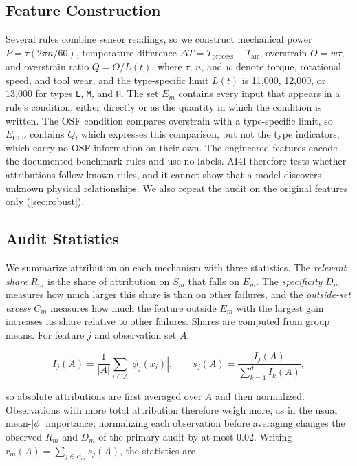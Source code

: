 \documentclass[conference]{IEEEtran}
\begin{document}
\subsection{Feature Construction}
\label{sec:features}

Several rules combine sensor readings, so we construct mechanical power
$P=\tau(2\pi n/60)$, temperature difference
$\Delta T=T_{\mathrm{process}}-T_{\mathrm{air}}$,
overstrain $O=w\tau$, and overstrain ratio $Q=O/L(t)$,
where $\tau$, $n$, and $w$ denote torque, rotational speed,
and tool wear, and the type-specific limit $L(t)$
is 11{,}000, 12{,}000, or 13{,}000 for types
\texttt{L}, \texttt{M}, and \texttt{H}. The set $E_m$ contains every input that appears in a rule's condition, either directly or as the quantity in which the condition is written. The OSF condition compares overstrain with a type-specific limit, so $E_{\mathrm{OSF}}$ contains $Q$, which expresses this comparison, but not the type indicators, which carry no OSF information on their own. The engineered features encode the documented benchmark rules and use no labels. AI4I therefore tests whether attributions follow known rules, and it cannot show that a model discovers unknown physical relationships. We also repeat the audit on the original features only (\cref{sec:robust}).

\subsection{Audit Statistics}
\label{sec:stats}

We summarize attribution on each mechanism with three statistics. The \emph{relevant share} $R_m$ is the share of attribution on $S_m$ that falls on $E_m$. The \emph{specificity} $D_m$ measures how much larger this share is than on other failures, and the \emph{outside-set excess} $C_m$ measures how much the feature outside $E_m$ with the largest gain increases its share relative to other failures. Shares are computed from group means. For feature $j$ and observation set $A$,

\begin{equation}
I_{j}(A)=\frac{1}{|A|}\sum_{i\in A}|\phi_j(x_i)|,
\qquad
s_j(A)=\frac{I_{j}(A)}{\sum_{k=1}^{d}I_{k}(A)},
\label{eq:mean_shap}
\end{equation}

so absolute attributions are first averaged over $A$ and then normalized. Observations with more total attribution therefore weigh more, as in the usual mean-$|\phi|$ importance; normalizing each observation before averaging changes the observed $R_m$ and $D_m$ of the primary audit by at most 0.02. Writing $r_m(A)=\sum_{j\in E_m}s_j(A)$, the statistics are
\end{document}
